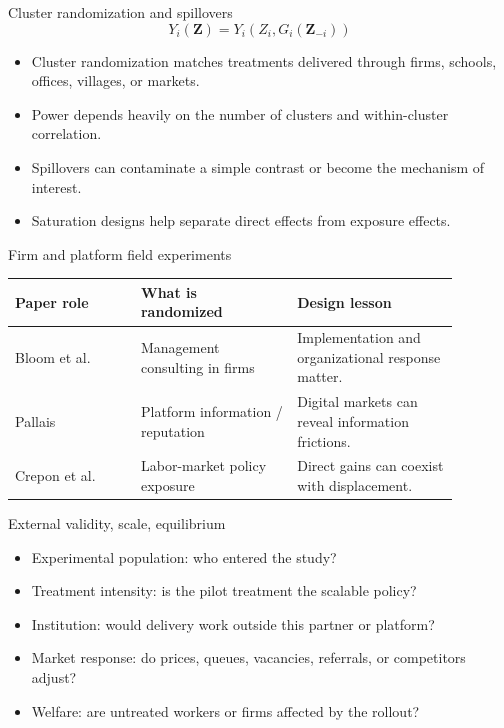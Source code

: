 \documentclass[aspectratio=169,11pt]{beamer}
\begin{document}
\begin{frame}{Cluster randomization and spillovers}
\[
Y_i(\mathbf{Z}) = Y_i\left(Z_i, G_i(\mathbf{Z}_{-i})\right)
\]

\begin{itemize}
    \item Cluster randomization matches treatments delivered through firms, schools, offices, villages, or markets.
    \item Power depends heavily on the number of clusters and within-cluster correlation.
    \item Spillovers can contaminate a simple contrast or become the mechanism of interest.
    \item Saturation designs help separate direct effects from exposure effects.
\end{itemize}
\end{frame}

\begin{frame}{Firm and platform field experiments}
\small
\begin{tabular}{p{0.25\linewidth} p{0.31\linewidth} p{0.32\linewidth}}
\toprule
Paper role & What is randomized & Design lesson \\
\midrule
Bloom et al. & Management consulting in firms & Implementation and organizational response matter. \\
Pallais & Platform information / reputation & Digital markets can reveal information frictions. \\
Crepon et al. & Labor-market policy exposure & Direct gains can coexist with displacement. \\
\bottomrule
\end{tabular}
\end{frame}

\begin{frame}{External validity, scale, equilibrium}
\begin{itemize}
    \item Experimental population: who entered the study?
    \item Treatment intensity: is the pilot treatment the scalable policy?
    \item Institution: would delivery work outside this partner or platform?
    \item Market response: do prices, queues, vacancies, referrals, or competitors adjust?
    \item Welfare: are untreated workers or firms affected by the rollout?
\end{itemize}
\end{frame}
\end{document}
